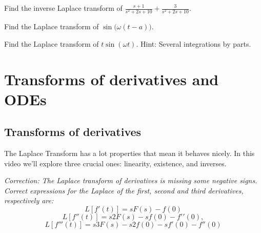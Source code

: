 \begin{exercise}
	Find the inverse Laplace transform of $\frac{s+1}{s^{2}+2s+10}+\frac{3}{s^{2}+2s+10}$.
\end{exercise}

\begin{exercise}
Find the Laplace transform of $\sin\bigl(\omega (t-a)\bigr)$.
\end{exercise}

\begin{exercise}
Find the Laplace transform of $t\sin(\omega t)$.  Hint: Several integrations
by parts.
\end{exercise}



\sectionnewpage
\section{Transforms of derivatives and ODEs}
\label{transformsofders:section}


\subsection{Transforms of derivatives}


\begin{video}
	The Laplace Transform has a lot properties that mean it behaves nicely. In this video we'll explore three crucial ones: linearity, existence, and inverses. 

	\emph{Correction: The Laplace transform of derivatives is missing some negative signs. Correct expressions for the Laplace of the first, second and third derivatives, respectively are:}
\[L[f'(t)]=sF(s)−f(0)\]
\[L[f''(t)]=s2F(s)−sf(0)−f'′(0),\]
\[L[f'''(t)]=s3F(s)−s2f(0)−sf'(0)−f''(0)\]
\end{video}

